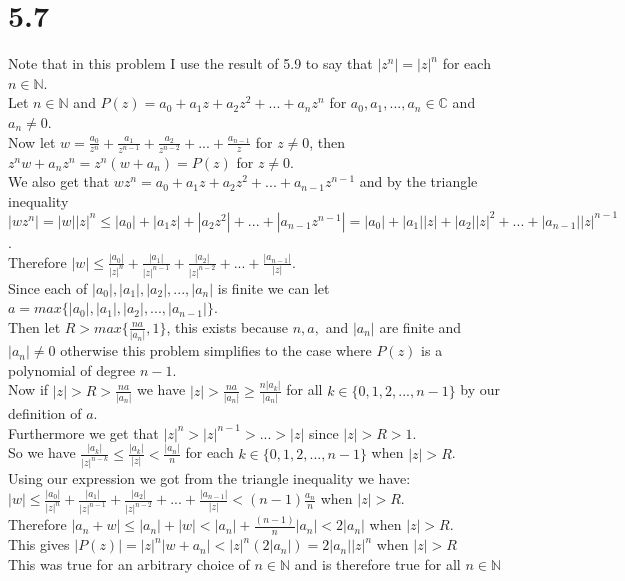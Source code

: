 \documentclass{article}
\begin{document}
\section*{5.7}
\begin{center}
    \doublespacing
    Note that in this problem I use the result of 5.9 to say that $|z^n| = |z|^n$ for each $n\in\mathbb{N}$.
    \break
    \\Let $n\in\mathbb{N}$ and $P(z) = a_0 + a_1 z + a_2 z^2 + ... + a_n z^n$ for $a_0, a_1, ..., a_n\in\mathbb{C}$ and $a_n\neq 0$.
    \\Now let $w =\frac{a_0}{z^n} +\frac{a_1}{z^{n-1}} +\frac{a_2}{z^{n-2}} + ... +\frac{a_{n-1}}{z}$ for $z\neq 0$, then $z^n w + a_n z^n = z^n (w + a_n) = P(z)$ for $z\neq 0$.
    \\We also get that $w z^n = a_0 + a_1 z + a_2 z^2 + ... + a_{n-1} z^{n-1}$ and by the triangle inequality $|w z^n| = |w||z|^n\leq |a_0| + |a_1 z| + |a_2 z^2| + ... + |a_{n-1} z^{n-1}| = |a_0| + |a_1||z| + |a_2||z|^2 + ... + |a_{n-1}||z|^{n-1}$.
    \\Therefore $|w|\leq\frac{|a_0|}{|z|^n} +\frac{|a_1|}{|z|^{n-1}} +\frac{|a_2|}{|z|^{n-2}} + ... +\frac{|a_{n-1}|}{|z|}$.
    \\Since each of $|a_0|, |a_1|, |a_2|, ..., |a_n|$ is finite we can let $a = max\{|a_0|, |a_1|, |a_2|, ..., |a_{n-1}|\}$.
    \\Then let $R > max\{\frac{n a}{|a_n|}, 1\}$, this exists because $n, a,$ and $|a_n|$ are finite and $|a_n|\neq 0$ otherwise this problem simplifies to the case where $P(z)$ is a polynomial of degree $n-1$.
    \\Now if $|z| > R >\frac{n a}{|a_n|}$ we have $|z| >\frac{n a}{|a_n|}\geq\frac{n |a_k|}{|a_n|}$ for all $k\in\{0, 1, 2, ..., n-1\}$ by our definition of $a$.
    \\Furthermore we get that $|z|^n > |z|^{n-1} > ... > |z|$ since $|z| > R > 1$.
    \\So we have $\frac{|a_k|}{|z|^{n-k}}\leq\frac{|a_k|}{|z|} <\frac{|a_n|}{n}$ for each $k\in\{0, 1, 2, ..., n-1\}$ when $|z| > R$.
    \\Using our expression we got from the triangle inequality we have:
    \\$|w|\leq\frac{|a_0|}{|z|^n} +\frac{|a_1|}{|z|^{n-1}} +\frac{|a_2|}{|z|^{n-2}} + ... +\frac{|a_{n-1}|}{|z|} < (n-1)\frac{a_n}{n}$ when $|z| > R$.
    \\Therefore $|a_n + w|\leq |a_n| + |w| < |a_n| +\frac{(n-1)}{n}|a_n| < 2|a_n|$ when $|z| > R$.
    \\This gives $|P(z)| = |z|^n |w + a_n| < |z|^n (2|a_n|) = 2|a_n||z|^n$ when $|z| > R$ 
    \\This was true for an arbitrary choice of $n\in\mathbb{N}$ and is therefore true for all $n\in\mathbb{N}$ \qedsymbol
\end{center}
\end{document}

